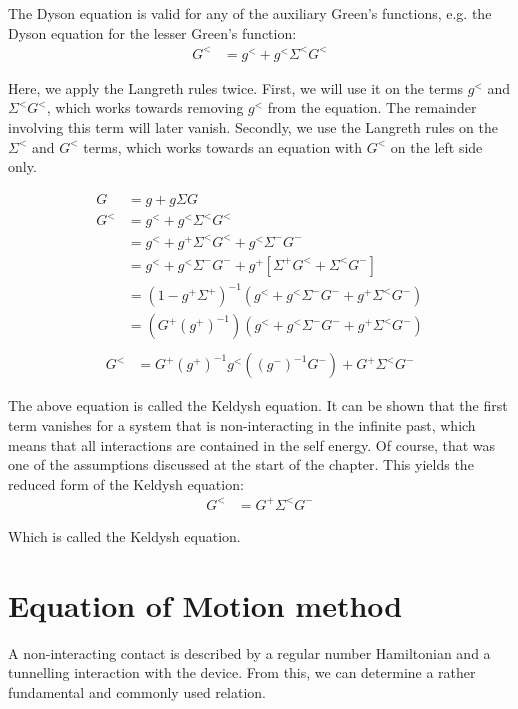 The Dyson equation is valid for any of the auxiliary Green's functions, e.g. the Dyson equation for the lesser Green's function:
\begin{align*}
G^< &= g^< + g^< \Sigma^< G^<  
\end{align*}

Here, we apply the Langreth rules twice. First, we will use it on the terms $g^<$ and $\Sigma^< G^<$, which works towards removing $g^<$ from the equation. The remainder involving this term will later vanish. Secondly, we use the Langreth rules on the $\Sigma^<$ and $G^<$ terms, which works towards an equation with $G^<$ on the left side only.


\begin{align*}
G &= g + g\Sigma G \\
G^< &= g^<  + g^< \Sigma^< G^< \\
 &= g^<  + g^+ \Sigma^< G^< + g^< \Sigma^- G^- \\
 &= g^<  + g^< \Sigma^- G^- + g^+ \left[ \Sigma^+ G^< + \Sigma^< G^- \right]\\
 &= (1 - g^+ \Sigma^+)^{-1} \left( g^<  + g^< \Sigma^- G^- + g^+ \Sigma^< G^-\right) \\
 &= \left(G^+ (g^+)^{-1}\right)\left( g^<  + g^< \Sigma^- G^- + g^+ \Sigma^< G^-\right) \\ 
\end{align*}
\begin{align}
G^< &= G^+ (g^+)^{-1} g^< \left((g^-)^{-1}G^-  \right) + G^+  \Sigma^< G^- \label{eq:keldysh}
\end{align}

The above equation is called the Keldysh equation. It can be shown that the first term vanishes for a system that is non-interacting in the infinite past, which means that all interactions are contained in the self energy. Of course, that was one of the assumptions discussed at the start of the chapter. This yields the reduced form of the Keldysh equation:
\begin{align*}
G^< &=  G^+ \Sigma^< G^- 
\end{align*}

Which is called the Keldysh equation.
 

\section{Equation of Motion method}
\label{sec:eommethod}
A non-interacting contact is described by a regular number Hamiltonian and a tunnelling interaction with the device. From this, we can determine a rather fundamental and commonly used relation. 


